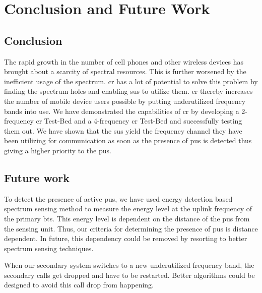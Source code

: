 \chapter{Conclusion and Future Work}

\section{Conclusion}
The rapid growth in the number of cell phones and other wireless devices has 
brought about a scarcity of spectral resources. This is further worsened by the
inefficient usage of the spectrum. \acrlong{cr} has a lot of potential to solve this problem
by finding the spectrum holes and enabling \glspl{su} to utilize them. \gls{cr} 
thereby increases the number of mobile device users possible by putting 
underutilized frequency bands into use. We have 
demonstrated the capabilities of \gls{cr} by developing a 2-frequency \gls{cr} Test-Bed and
a 4-frequency \gls{cr} Test-Bed and successfully testing them out.  We have shown
that the \glspl{su} yield the frequency channel they have been utilizing
for communication as soon as the presence of \glspl{pu} is detected thus
giving a higher priority to the \glspl{pu}.


\section{Future work}
To detect the presence of active \glspl{pu}, we have used energy detection 
based spectrum sensing method to measure the energy level at the uplink 
frequency of the primary \gls{bts}. This energy level is dependent
on the distance of the \glspl{pu} from the sensing unit. Thus, our criteria
for determining the presence of \glspl{pu} is distance dependent. 
In future, this dependency could be removed by resorting to better 
spectrum sensing techniques.

When our secondary system switches to a new underutilized frequency band, the
secondary calls get dropped and have to be restarted. Better
algorithms could be designed to avoid this call drop from happening.